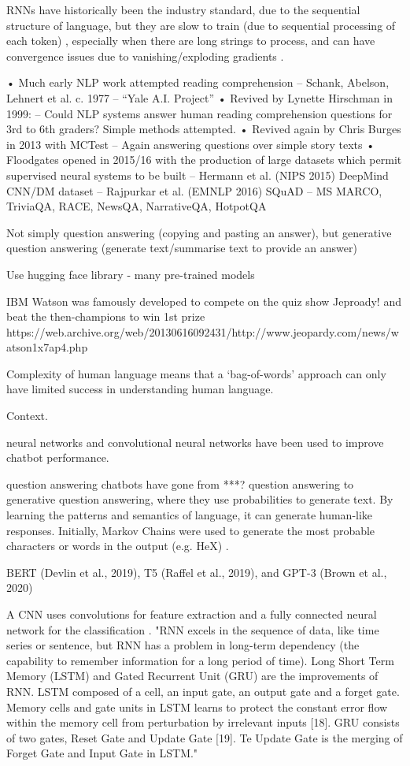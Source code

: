 RNNs have historically been the industry standard, due to the sequential structure of language, but they are slow to train (due to sequential processing of each token) \citep{vaswani2017attention}, especially when there are long strings to process, and can have convergence issues due to vanishing/exploding gradients \citep{Lipton}.

• Much early NLP work attempted reading comprehension
– Schank, Abelson, Lehnert et al. c. 1977 – “Yale A.I. Project”
• Revived by Lynette Hirschman in 1999:
– Could NLP systems answer human reading comprehension questions for 
3rd to 6th graders? Simple methods attempted.
• Revived again by Chris Burges in 2013 with MCTest
– Again answering questions over simple story texts
• Floodgates opened in 2015/16 with the production of large datasets which 
permit supervised neural systems to be built
– Hermann et al. (NIPS 2015) DeepMind CNN/DM dataset
– Rajpurkar et al. (EMNLP 2016) SQuAD
– MS MARCO, TriviaQA, RACE, NewsQA, NarrativeQA, HotpotQA
%

Not simply question answering (copying and pasting an answer), but generative question answering (generate text/summarise text to provide an answer)

Use hugging face library - many pre-trained models

IBM Watson was famously developed to compete on the quiz show Jeproady! and beat the then-champions to win 1st prize https://web.archive.org/web/20130616092431/http://www.jeopardy.com/news/watson1x7ap4.php


 

Complexity of human language means that a `bag-of-words' approach can only have limited success in understanding human language.

Context.

neural networks and convolutional neural networks have been used to improve chatbot performance.

question answering chatbots have gone from ***? question answering to generative question answering, where they use probabilities to generate text. By learning the patterns and semantics of language, it can generate human-like responses. Initially, Markov Chains were used to generate the most probable characters or words in the output (e.g. HeX) \citep{Luka, Ahmad}. 

BERT (Devlin et al., 2019), T5 (Raffel et al., 2019), and GPT-3 (Brown et al., 2020)

A CNN uses convolutions for feature extraction and a fully connected neural network for the classification \citep{Budiharto}. "RNN excels in the sequence of data, like time series or sentence, but RNN has a problem in long-term dependency (the capability to remember information for a long period of time). Long Short Term Memory (LSTM) and Gated Recurrent Unit (GRU) are the improvements of RNN. LSTM composed of a cell, an input gate, an output gate and a forget gate. Memory cells and gate units in LSTM learns to protect the constant error flow within the memory cell from perturbation by irrelevant inputs [18]. GRU consists of two gates, Reset Gate and Update Gate [19]. Te Update Gate is the merging of Forget Gate and Input Gate in LSTM."


